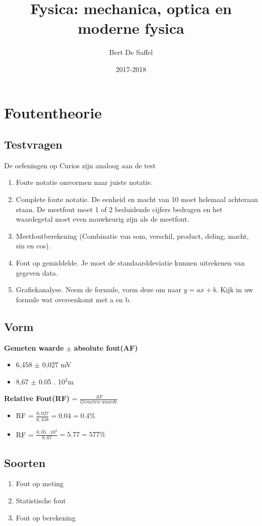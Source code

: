 \documentclass[12pt]{report}
\title{Fysica: mechanica, optica en moderne fysica}
\author{Bert De Saffel}
\date{2017-2018}
\newcommand{\important}[1] {\textbf{\color{orange}#1}}
\begin{document}
\maketitle
\tableofcontents

\chapter{Foutentheorie}
\section{Testvragen}
De oefeningen op Curios zijn analoog aan de test
\begin{enumerate}
 \item Foute notatie omvormen naar juiste notatie.
 \item Complete foute notatie. De eenheid en macht van 10 moet helemaal achteraan staan. De meetfout 
 moet 1 of 2 beduidende cijfers bedragen en het waardegetal moet even nauwkeurig zijn als de meetfout.
 \item Meetfoutberekening (Combinatie van som, verschil, product, deling, macht, sin en cos).
 \item Fout op gemiddelde. Je moet de standaarddeviatie kunnen uitrekenen van gegeven data.
 \item Grafiekanalyse. Neem de formule, vorm deze om naar $y = ax + b$. Kijk in uw formule wat
 overeenkomt met a en b.
\end{enumerate}

\section{Vorm}
\important{Gemeten waarde} $\pm$ \important{absolute fout(AF)}
\begin{itemize}
 \item 6,458 $\pm$ 0,027 mV
 \item 8,67  $\pm$ 0.05 . 10$^3$m
\end{itemize}
\important{Relative Fout(RF)} = $\frac{AF}{Gemeten\;waarde}$
\begin{itemize}
 \item RF = $\frac{0,027}{6,458} = 0.04 = 0.4\%$
 \item RF = $\frac{0,05\;.\;10^3}{8,67} = 5.77 = 577\%$
\end{itemize}
\section{Soorten}
\begin{enumerate}
 \item Fout op meting
 \item Statistische fout
 \item Fout op berekening
\end{enumerate}
\end{document}
